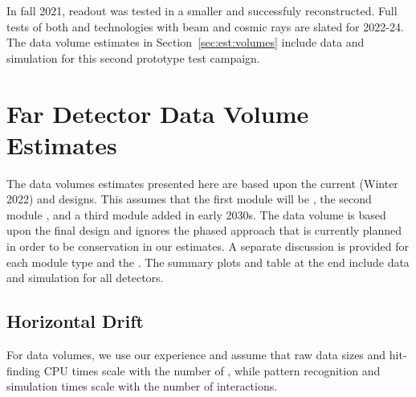 \documentclass[../main-v1.tex]{subfiles}
\begin{document}
In fall 2021, %
 readout was tested in a smaller \coldbox and successfuly reconstructed. Full  tests of both  and  technologies with beam and cosmic rays are slated for 2022-24. The data volume estimates in Section~\ref{sec:est:volumes} include data and simulation for this second prototype test campaign. 







\section{Far Detector Data Volume Estimates }
\label{sec:est:FD}  

The data volumes estimates presented here are based upon the current (Winter 2022)   and  designs. This assumes that the first module will be , the second module , and a third  module added in early 2030s. The  data volume is based upon the final  design and ignores the phased approach that is currently planned in order to be conservation in our estimates. A separate discussion is provided for each  module type and the . The summary plots and table at the end include data and simulation for all detectors.

\subsection{Horizontal Drift}
For   data volumes, we use our  experience and assume that raw data sizes and hit-finding CPU times scale with the number of , while pattern recognition and simulation times scale with the number of interactions. 
\end{document}
